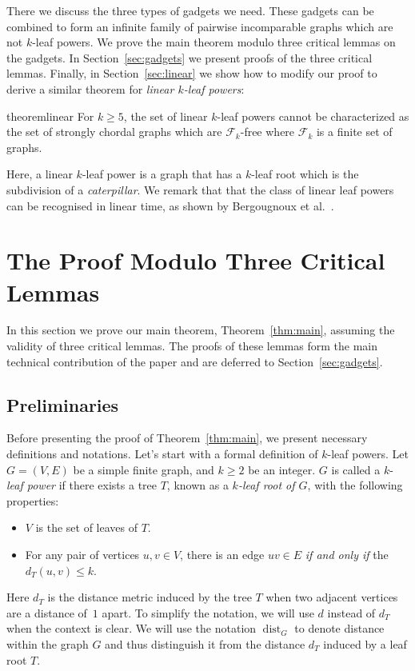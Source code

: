 \documentclass[11pt,letter]{article}
\theoremstyle{remark}
\newcommand{\F}{\mathscr{F}}
\DeclareMathOperator{\dist}{dist}
\begin{document}
There we discuss the three types of gadgets we need. These gadgets can be combined to form an infinite family of pairwise incomparable graphs which are not $k$-leaf powers.
We prove the main theorem modulo three critical lemmas on the gadgets. 
In Section~\ref{sec:gadgets} we present proofs of the three critical lemmas.
Finally, in Section~\ref{sec:linear} we show how to modify our proof
to derive a similar theorem for \emph{linear $k$-leaf powers}:
\begin{restatable}{theorem}{linear}\label{thm:linear}
    For $k\geq 5$, the set of linear $k$-leaf powers cannot be characterized as the set of strongly chordal graphs which are $\F_k$-free where $\F_k$ is a finite set of graphs.
\end{restatable}
Here, a linear $k$-leaf power is a graph that has a $k$-leaf root which is the subdivision of a \emph{caterpillar}. We remark that that the class of linear leaf powers can be recognised in linear time, as shown by Bergougnoux et al.~\cite{Bergougnoux}.




\section{The Proof Modulo Three Critical Lemmas}\label{sec:proof}

In this section we prove our main theorem, Theorem~\ref{thm:main},
assuming the validity of three critical lemmas.
The proofs of these lemmas form the main technical contribution of the paper and are deferred to Section~\ref{sec:gadgets}.


\subsection{Preliminaries}
Before presenting the proof of Theorem~\ref{thm:main}, we present  
necessary definitions and notations.
Let's start with a formal definition of $k$-leaf powers. Let $G = (V,E)$ be a simple finite graph, and $k\geq 2$ be an integer. $G$ is called a $k$-\emph{leaf power} if there exists a tree $T$, known as a {\em $k$-leaf root of $G$}, with the following properties:
\begin{itemize}
    \item $V$ is the set of leaves of $T$.
    \item For any pair of vertices $u,v \in V$, there is an edge $uv \in E$ {\em if and only if} the $d_T(u,v) \leq k$.
\end{itemize}
Here $d_T$ is the distance metric induced by the tree $T$ when two adjacent vertices are a distance of~$1$ apart.
To simplify the notation, we will use $d$ instead of $d_T$ when the context is clear. We will use the notation $\dist_G$ to denote distance within the graph $G$ and thus distinguish it from the distance $d_T$ induced by a leaf root $T$.
\end{document}

